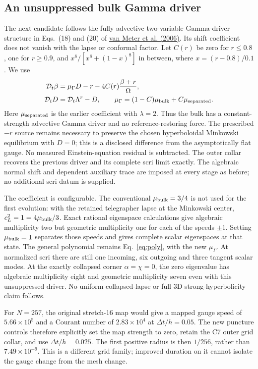 \documentclass[11pt]{article}
\newcommand{\dt}{\mathcal D_t}
\begin{document}
\subsection{An unsuppressed bulk Gamma driver}
The next candidate follows the fully advective two-variable Gamma-driver structure in Eqs.~(18) and (20) of \href{https://arxiv.org/html/gr-qc/0605030v2}{van Meter et al. (2006)}. Its shift coefficient does not vanish with the lapse or conformal factor. Let $C(r)$ be zero for $r\leq0.8$, one for $r\geq0.9$, and $x^8/[x^8+(1-x)^8]$ in between, where $x=(r-0.8)/0.1$. We use
\begin{align}
 \dt\beta&=\mu_\Gamma D-r-4C(r)\frac{\beta+r}{\Omega},\\
 \dt D&=\dt\Lambda^r-D,\qquad
 \mu_\Gamma=(1-C)\mu_{\rm bulk}+C\mu_{\rm separated}.
\end{align}
Here $\mu_{\rm separated}$ is the earlier coefficient with $\lambda=2$. Thus the bulk has a constant-strength advective Gamma driver and no reference-restoring force. The prescribed $-r$ source remains necessary to preserve the chosen hyperboloidal Minkowski equilibrium with $D=0$; this is a disclosed difference from the asymptotically flat gauge. No measured Einstein-equation residual is subtracted. The outer collar recovers the previous driver and its complete scri limit exactly. The algebraic normal shift and dependent auxiliary trace are imposed at every stage as before; no additional scri datum is supplied.

The coefficient is configurable. The conventional $\mu_{\rm bulk}=3/4$ is not used for the first evolution: with the retained telegrapher lapse at the Minkowski center, $c_L^2=1=4\mu_{\rm bulk}/3$. Exact rational eigenspace calculations give algebraic multiplicity two but geometric multiplicity one for each of the speeds $\pm1$. Setting $\mu_{\rm bulk}=1$ separates those speeds and gives complete scalar eigenspaces at that state. The general polynomial remains Eq.~\eqref{eq:poly}, with the new $\mu_\Gamma$. At normalized scri there are still one incoming, six outgoing and three tangent scalar modes. At the exactly collapsed corner $\alpha=\chi=0$, the zero eigenvalue has algebraic multiplicity eight and geometric multiplicity seven even with this unsuppressed driver. No uniform collapsed-lapse or full 3D strong-hyperbolicity claim follows.

For $N=257$, the original stretch-16 map would give a mapped gauge speed of $5.66\times10^5$ and a Courant number of $2.83\times10^4$ at $\Delta t/h=0.05$. The new puncture controls therefore explicitly set the map strength to zero, retain the C7 outer grid collar, and use $\Delta t/h=0.025$. The first positive radius is then $1/256$, rather than $7.49\times10^{-9}$. This is a different grid family; improved duration on it cannot isolate the gauge change from the mesh change.
\end{document}
